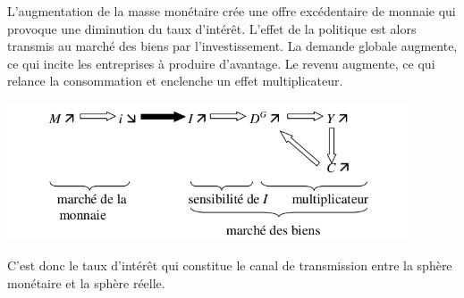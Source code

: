\documentclass[10pt]{book}
\begin{document}
L'augmentation de la masse monétaire crée une offre excédentaire de monnaie qui provoque une diminution du taux d'intérêt. L'effet de la politique est alors transmis au marché des biens par l'investissement. La demande globale augmente, ce qui incite les entreprises à produire d'avantage. Le revenu augmente, ce qui relance la consommation et enclenche un effet multiplicateur.
\begin{center}
  \includegraphics[width=12cm]{graph34.png}
\end{center}
C'est donc le taux d'intérêt qui constitue le canal de transmission entre la sphère monétaire et la sphère réelle.
\end{document}
